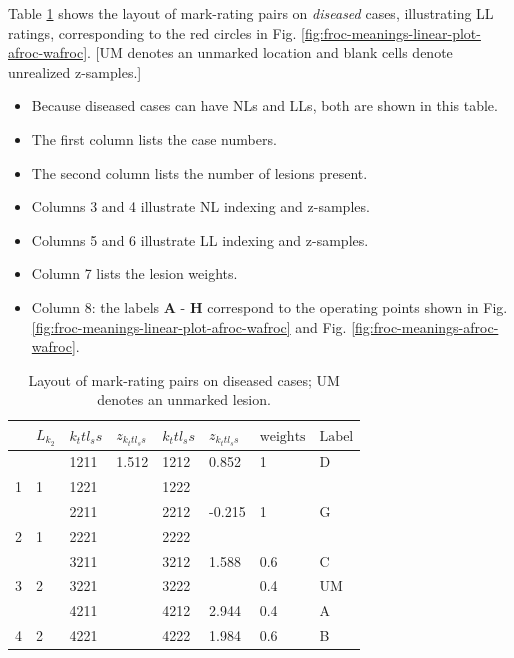 \documentclass[
]{book}
\providecommand{\tightlist}{%
  \setlength{\itemsep}{0pt}\setlength{\parskip}{0pt}}
\begin{document}
Table \ref{tab:froc-meanings-table-diseased} shows the layout of mark-rating pairs on \emph{diseased} cases, illustrating LL ratings, corresponding to the red circles in Fig. \ref{fig:froc-meanings-linear-plot-afroc-wafroc}. {[}UM denotes an unmarked location and blank cells denote unrealized z-samples.{]}

\begin{itemize}
\tightlist
\item
  Because diseased cases can have NLs and LLs, both are shown in this table.
\item
  The first column lists the case numbers.
\item
  The second column lists the number of lesions present.
\item
  Columns 3 and 4 illustrate NL indexing and z-samples.
\item
  Columns 5 and 6 illustrate LL indexing and z-samples.
\item
  Column 7 lists the lesion weights.
\item
  Column 8: the labels \textbf{A} - \textbf{H} correspond to the operating points shown in Fig. \ref{fig:froc-meanings-linear-plot-afroc-wafroc} and Fig. \ref{fig:froc-meanings-afroc-wafroc}.
\end{itemize}

\begin{table}

\caption{\label{tab:froc-meanings-table-diseased}Layout of mark-rating pairs on diseased cases; UM denotes an unmarked lesion.}
\centering
\begin{tabular}[t]{l|l|l|l|l|l|l|l}
\hline
 & $L_{k_2}$ & $k_t t l_s s$ & $z_{k_t t l_s s}$ & $k_t t l_s s$ & $z_{k_t t l_s s}$ & $\text{weights}$ & $\text{Label}$\\
\hline
 &  & 1211 & 1.512 & 1212 & 0.852 & 1 & D\\
\hline
1 & 1 & 1221 &  & 1222 &  &  & \\
\hline
 &  & 2211 &  & 2212 & -0.215 & 1 & G\\
\hline
2 & 1 & 2221 &  & 2222 &  &  & \\
\hline
 &  & 3211 &  & 3212 & 1.588 & 0.6 & C\\
\hline
3 & 2 & 3221 &  & 3222 &  & 0.4 & UM\\
\hline
 &  & 4211 &  & 4212 & 2.944 & 0.4 & A\\
\hline
4 & 2 & 4221 &  & 4222 & 1.984 & 0.6 & B\\
\hline
\end{tabular}
\end{table}
\end{document}
